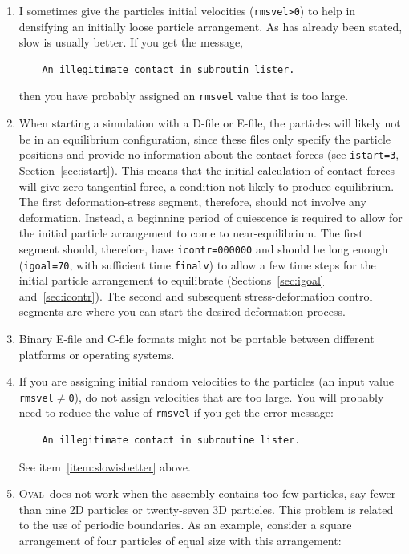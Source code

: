 \documentclass[letterpaper,11pt]{article}
\newcommand{\Oval}{\textsc{Oval}}
\begin{document}
\begin{enumerate}
%
\item
I sometimes give the particles initial velocities (\texttt{rmsvel>0})
to help in densifying an initially loose particle arrangement.
As has already been stated, slow is usually better.
If you get the message,
\begin{verbatim}
    An illegitimate contact in subroutin lister.
\end{verbatim}
then you have probably assigned an \texttt{rmsvel} value that is
too large.
\item
When starting a simulation with a D-file or E-file, the
particles will likely not be in an equilibrium configuration,
since these files only specify the particle positions and provide
no information about the contact forces
(see \texttt{istart=3}, Section~\ref{sec:istart}).  
This means that the
initial calculation of contact forces will give zero tangential force,
a condition not likely to produce equilibrium.
The first deformation-stress segment, therefore, should
not involve any deformation.
Instead,
a beginning period of quiescence is required to allow for the initial particle
arrangement to come to near-equilibrium.
The first segment should, therefore, have
\texttt{icontr=000000} and should be long enough
(\texttt{igoal=70}, with sufficient time \texttt{finalv})
to allow a few time steps for the initial particle arrangement
to equilibrate (Sections~\ref{sec:igoal} and~\ref{sec:icontr}).
The second and subsequent stress-deformation control segments are where you
can start the desired deformation process.
\item
Binary E-file and C-file formats might not be portable 
between different platforms or operating systems.
\item
If you are assigning initial random velocities to the particles
(an input value \mbox{\texttt{rmsvel}$\neq$\texttt{0}}), do not
assign velocities that are too large.
You will probably need to reduce the value of \texttt{rmsvel}
if you get the error message:
\begin{verbatim}
    An illegitimate contact in subroutine lister.
\end{verbatim}
See item~\ref{item:slowisbetter} above.
\item
\Oval\ does not work when the assembly contains too few particles,
say fewer than nine 2D particles or twenty-seven 3D particles.
This problem is related to the use of periodic boundaries.
As an example, consider a square arrangement of four particles of equal 
size with this arrangement:
%
\begin{center}

\end{center}
\end{enumerate}
\end{document}

